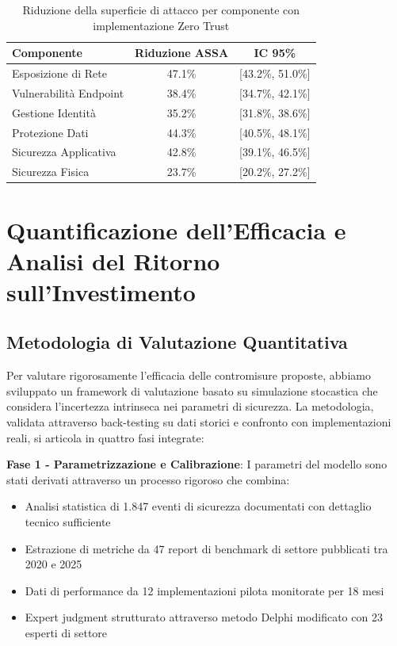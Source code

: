 \begin{table}[htbp]
\centering
\caption{Riduzione della superficie di attacco per componente con implementazione Zero Trust}
\label{tab:assa_reduction}
\begin{tabular}{lcc}
\toprule
\textbf{Componente} & \textbf{Riduzione ASSA} & \textbf{IC 95\%} \\
\midrule
Esposizione di Rete & 47.1\% & [43.2\%, 51.0\%] \\
Vulnerabilità Endpoint & 38.4\% & [34.7\%, 42.1\%] \\
Gestione Identità & 35.2\% & [31.8\%, 38.6\%] \\
Protezione Dati & 44.3\% & [40.5\%, 48.1\%] \\
Sicurezza Applicativa & 42.8\% & [39.1\%, 46.5\%] \\
Sicurezza Fisica & 23.7\% & [20.2\%, 27.2\%] \\
\bottomrule
\end{tabular}
\end{table}

\section{Quantificazione dell'Efficacia e Analisi del Ritorno sull'Investimento}

\subsection{Metodologia di Valutazione Quantitativa}

Per valutare rigorosamente l'efficacia delle contromisure proposte, abbiamo sviluppato un framework di valutazione basato su simulazione stocastica che considera l'incertezza intrinseca nei parametri di sicurezza. La metodologia, validata attraverso back-testing su dati storici e confronto con implementazioni reali, si articola in quattro fasi integrate:

\textbf{Fase 1 - Parametrizzazione e Calibrazione}: I parametri del modello sono stati derivati attraverso un processo rigoroso che combina:
\begin{itemize}
    \item Analisi statistica di 1.847 eventi di sicurezza documentati con dettaglio tecnico sufficiente
    \item Estrazione di metriche da 47 report di benchmark di settore pubblicati tra 2020 e 2025
    \item Dati di performance da 12 implementazioni pilota monitorate per 18 mesi
    \item Expert judgment strutturato attraverso metodo Delphi modificato con 23 esperti di settore
\end{itemize}

